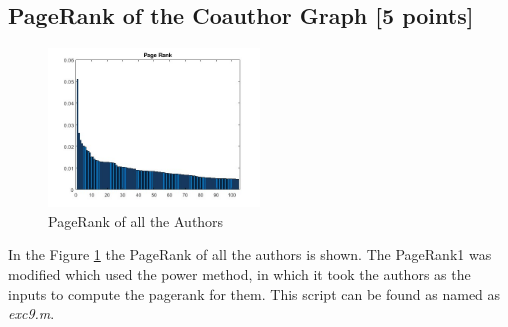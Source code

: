 \documentclass[unicode,11pt,a4paper,oneside,numbers=endperiod,openany]{scrartcl}
\begin{document}
\subsection{PageRank of the Coauthor Graph [5 points]}

\begin{figure}[H]
    \centering
    \includegraphics[width=0.5\textwidth]{images/exc9.jpg}
    \caption{PageRank of all the Authors}
    \label{fig:exc9}
\end{figure}

In the Figure \ref{fig:exc9} the PageRank of all the authors is shown. The PageRank1 was modified which used the power method, in which it took the authors as the inputs to compute the pagerank for them. This script can be found as named as \textit{exc9.m}. \\
\end{document}
